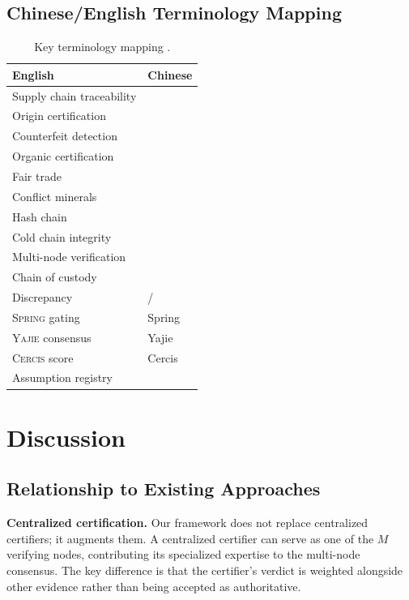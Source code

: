 \documentclass[11pt,a4paper]{article}
\theoremstyle{definition}
\theoremstyle{remark}
\newcommand{\Yajie}{\textsc{Yajie}}
\newcommand{\Spring}{\textsc{Spring}}
\newcommand{\Cercis}{\textsc{Cercis}}
\begin{document}
\subsection{Chinese/English Terminology Mapping }

\begin{table}[htbp]
\centering
\caption{Key terminology mapping .}
\label{tab:terminology}
\begin{tabular}{ll}
\toprule
\textbf{English } & \textbf{Chinese } \\
\midrule
Supply chain traceability &  \\
Origin certification &  \\
Counterfeit detection &  \\
Organic certification &  \\
Fair trade &  \\
Conflict minerals &  \\
Hash chain &  \\
Cold chain integrity &  \\
Multi-node verification &  \\
Chain of custody &  \\
Discrepancy & / \\
\Spring{} gating & Spring \\
\Yajie{} consensus & Yajie \\
\Cercis{} score & Cercis \\
Assumption registry &  \\
\bottomrule
\end{tabular}
\end{table}

\section{Discussion }
\label{sec:discussion}

\subsection{Relationship to Existing Approaches}

\textbf{Centralized certification.} Our framework does not replace centralized certifiers; it augments them. A centralized certifier can serve as one of the $M$ verifying nodes, contributing its specialized expertise to the multi-node consensus. The key difference is that the certifier's verdict is weighted alongside other evidence rather than being accepted as authoritative.
\end{document}
